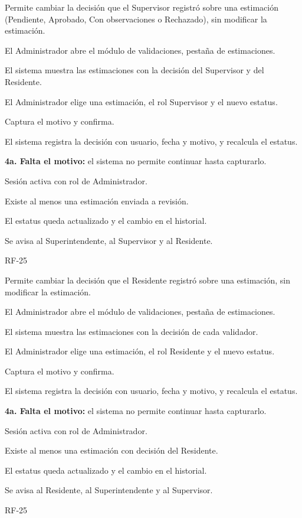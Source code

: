{Permite cambiar la decisión que el Supervisor registró sobre una estimación (Pendiente, Aprobado, Con observaciones o Rechazado), sin modificar la estimación.}
{\item El Administrador abre el módulo de validaciones, pestaña de estimaciones.
 \item El sistema muestra las estimaciones con la decisión del Supervisor y del Residente.
 \item El Administrador elige una estimación, el rol Supervisor y el nuevo estatus.
 \item Captura el motivo y confirma.
 \item El sistema registra la decisión con usuario, fecha y motivo, y recalcula el estatus.}
{\item \textbf{4a. Falta el motivo:} el sistema no permite continuar hasta capturarlo.}
{\item Sesión activa con rol de Administrador.
 \item Existe al menos una estimación enviada a revisión.}
{\item El estatus queda actualizado y el cambio en el historial.
 \item Se avisa al Superintendente, al Supervisor y al Residente.}
{RF-25}

{Permite cambiar la decisión que el Residente registró sobre una estimación, sin modificar la estimación.}
{\item El Administrador abre el módulo de validaciones, pestaña de estimaciones.
 \item El sistema muestra las estimaciones con la decisión de cada validador.
 \item El Administrador elige una estimación, el rol Residente y el nuevo estatus.
 \item Captura el motivo y confirma.
 \item El sistema registra la decisión con usuario, fecha y motivo, y recalcula el estatus.}
{\item \textbf{4a. Falta el motivo:} el sistema no permite continuar hasta capturarlo.}
{\item Sesión activa con rol de Administrador.
 \item Existe al menos una estimación con decisión del Residente.}
{\item El estatus queda actualizado y el cambio en el historial.
 \item Se avisa al Residente, al Superintendente y al Supervisor.}
{RF-25}
